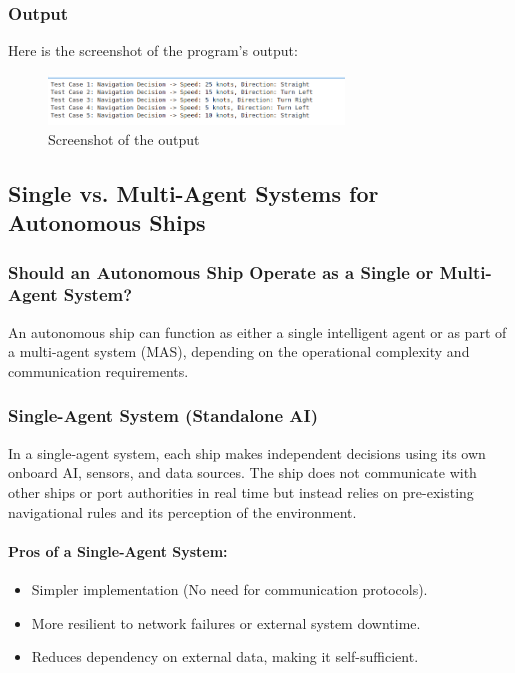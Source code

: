 \documentclass{article}
\begin{document}
\subsubsection{Output}
Here is the screenshot of the program's output:

\begin{figure}[h!]
    \centering
    \includegraphics[width=0.7\textwidth]{1_b.png} 
    \caption{Screenshot of the output}
\end{figure}
\subsection{Single vs. Multi-Agent Systems for Autonomous Ships}

\subsubsection{\large Should an Autonomous Ship Operate as a Single or Multi-Agent System?}

An autonomous ship can function as either a single intelligent agent or as part of a multi-agent system (MAS), depending on the operational complexity and communication requirements.

\subsubsection{Single-Agent System (Standalone AI)}
In a single-agent system, each ship makes independent decisions using its own onboard AI, sensors, and data sources. The ship does not communicate with other ships or port authorities in real time but instead relies on pre-existing navigational rules and its perception of the environment.

\paragraph{Pros of a Single-Agent System:}
\begin{itemize}
    \item Simpler implementation (No need for communication protocols).
    \item More resilient to network failures or external system downtime.
    \item Reduces dependency on external data, making it self-sufficient.
\end{itemize}
\end{document}

